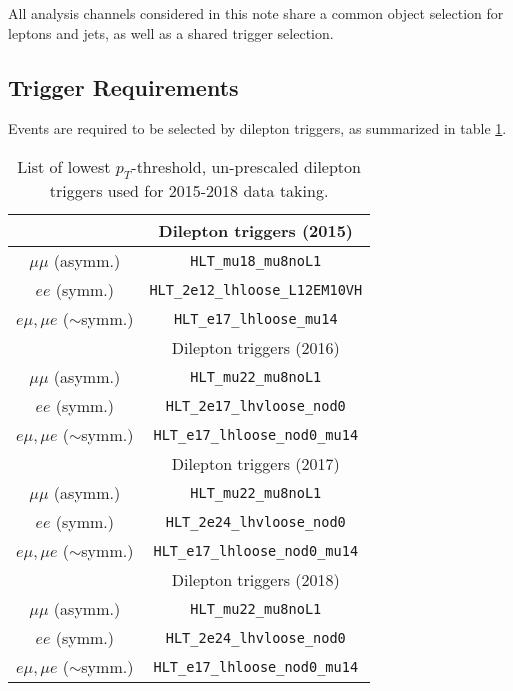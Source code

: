 
All analysis channels considered in this note share a common object selection for leptons and jets, as well as a shared trigger selection. 

\subsection{Trigger Requirements}

Events are required to be selected by dilepton triggers, as summarized in table \ref{tbl:trigger}.

\begin{table}[H]
 \begin{center}
   \begin{tabular}{cc}
     \toprule
                  & Dilepton triggers (2015) \\
     \midrule
      $\mu\mu$ (asymm.)          & \verb!HLT_mu18_mu8noL1! \\
      $ee$ (symm.)               & \verb!HLT_2e12_lhloose_L12EM10VH! \\
      $e\mu,\mu e$ ($\sim$symm.) & \verb!HLT_e17_lhloose_mu14! \\
     \bottomrule
                       & Dilepton triggers (2016) \\
     \midrule
      $\mu\mu$ (asymm.)                   & \verb!HLT_mu22_mu8noL1! \\
      $ee$ (symm.)                        & \verb!HLT_2e17_lhvloose_nod0! \\
      $e\mu,\mu e$ ($\sim$symm.)          & \verb!HLT_e17_lhloose_nod0_mu14! \\
     \bottomrule

                  & Dilepton triggers (2017) \\
     \midrule
      $\mu\mu$ (asymm.)                   & \verb!HLT_mu22_mu8noL1! \\
      $ee$ (symm.)                        & \verb!HLT_2e24_lhvloose_nod0! \\
      $e\mu,\mu e$ ($\sim$symm.)          & \verb!HLT_e17_lhloose_nod0_mu14! \\
     \bottomrule
                  & Dilepton triggers (2018) \\
     \midrule
      $\mu\mu$ (asymm.)                   & \verb!HLT_mu22_mu8noL1! \\
      $ee$ (symm.)                        & \verb!HLT_2e24_lhvloose_nod0! \\
      $e\mu,\mu e$ ($\sim$symm.)          & \verb!HLT_e17_lhloose_nod0_mu14! \\
      \bottomrule
   \end{tabular}
   \caption{\label{tbl:trigger} List of lowest $p_{T}$-threshold, un-prescaled dilepton triggers used for 2015-2018 data taking.}
 \end{center}
\end{table}

